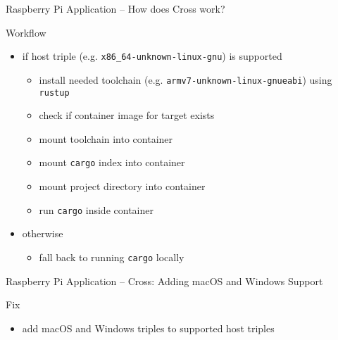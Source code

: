 \begin{frame}{Raspberry Pi Application -- How does Cross work?}
  \begin{block}{Workflow}
     \begin{itemize}
       \item if host triple (e.g. \texttt{x86\_64-unknown-linux-gnu}) is supported
         \begin{itemize}
          \item install needed toolchain (e.g. \texttt{armv7-unknown-linux-gnueabi}) using \texttt{rustup}
          \item check if container image for target exists
          \item mount toolchain into container
          \item mount \texttt{cargo} index into container
          \item mount project directory into container
          \item run \texttt{cargo} inside container
         \end{itemize}
       \item otherwise
         \begin{itemize}
           \item fall back to running \texttt{cargo} locally
         \end{itemize}
    \end{itemize}
  \end{block}
\end{frame}

\begin{frame}{Raspberry Pi Application -- Cross: Adding macOS and Windows Support}
  \begin{block}{Fix}
    \begin{itemize}
      \item add macOS and Windows triples to supported host triples
    \end{itemize}
  \end{block}


\end{frame}

